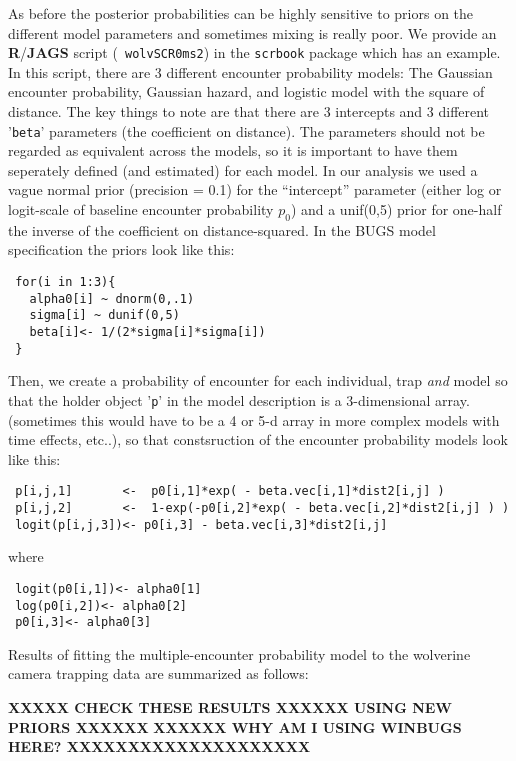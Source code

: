 As before the posterior probabilities can be highly sensitive to
priors on the different model parameters and sometimes mixing is
really poor.  We provide an {\bf R}/{\bf JAGS} script (\mbox{\tt
  wolvSCR0ms2}) in the \mbox{\tt scrbook} package which has an
example.  In this script, there are 3 different encounter probability
models:
The Gaussian encounter probability, Gaussian hazard, and logistic
model with the square of distance.  The key things to note are that
there are 3 intercepts and 3 different '\mbox{\tt beta}' parameters
(the coefficient on distance). The parameters should not be regarded
as equivalent across the models, so it is important to have them
seperately defined (and estimated) for each model.  In our analysis we
used a vague normal prior (precision = 0.1) for the ``intercept''
parameter (either log or logit-scale of baseline encounter probability
$p_{0}$) and a unif(0,5) prior for one-half the inverse of the
coefficient on distance-squared.
In the BUGS model specification the priors look like this:
\begin{verbatim}
 for(i in 1:3){
   alpha0[i] ~ dnorm(0,.1)
   sigma[i] ~ dunif(0,5)
   beta[i]<- 1/(2*sigma[i]*sigma[i])
 }
\end{verbatim}
Then,  we create a probability of encounter for each
individual, trap {\it and} model so that the holder object '\mbox{\tt p}' in the
model description is a 3-dimensional array. (sometimes this would have to be a 4
or 5-d array in more complex models with time effects, etc..), so that
constsruction of the encounter probability models look like this:
\begin{verbatim}
 p[i,j,1]       <-  p0[i,1]*exp( - beta.vec[i,1]*dist2[i,j] )
 p[i,j,2]       <-  1-exp(-p0[i,2]*exp( - beta.vec[i,2]*dist2[i,j] ) )
 logit(p[i,j,3])<- p0[i,3] - beta.vec[i,3]*dist2[i,j]
\end{verbatim}
where
\begin{verbatim}
 logit(p0[i,1])<- alpha0[1]
 log(p0[i,2])<- alpha0[2]
 p0[i,3]<- alpha0[3]
\end{verbatim}
Results of fitting the multiple-encounter probability model to the
wolverine camera trapping data are summarized as follows:

{\bf XXXXX CHECK THESE RESULTS XXXXXX USING NEW PRIORS XXXXXX}
{\bf XXXXXX WHY AM I USING WINBUGS HERE? XXXXXXXXXXXXXXXXXXXX}

